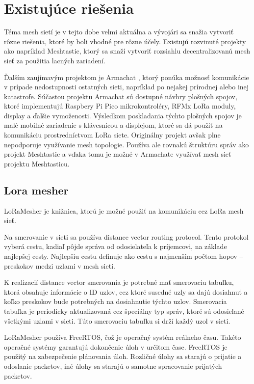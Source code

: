 \documentclass[slovak,master]{diploma}
\begin{document}
\chapter{Existujúce riešenia}
Téma mesh sietí je v tejto dobe velmi aktuálna a vývojári sa snažia vytvoriť rôzne riešenia, ktoré by boli vhodné pre rôzne účely.
Existujú rozvinuté projekty ako napríklad Meshtastic, ktorý sa snaží vytvoriť rozsiahlu decentralizovanú mesh sieť za použitia lacných zariadení.

Ďalším zaujímavým projektom je Armachat \cite{armachat}, ktorý ponúka možnosť komunikácie v prípade nedostupnosti ostatných sieti, napríklad po nejakej prírodnej alebo inej katastrofe.
Súčastou projektu Armachat sú dostupné návhry plošných spojov, ktoré implementujú Raspbery Pi Pico mikrokontroléry, RFMx LoRa moduly, display a ďalšie vymoženosti.
Výsledkom poskladania týchto plošných spojov je malé mobilné zariadenie s klávesnicou a displejom, ktoré sa dá použiť na komunikáciu prostredníctvom LoRa siete.
Originálny projekt avšak plne nepodporuje využívanie mesh topologie. Používa ale rovnakú štruktúru správ ako projekt Meshtastic a vďaka tomu je možné 
v Armachate využívať mesh sieť projektu Meshtasticu.

\section{Lora mesher}
LoRaMesher \cite{loramesher} je knižnica, ktorú je možné použiť na komunikáciu cez LoRa mesh sieť.

Na smerovanie v sieti sa používa distance vector routing protocol. Tento protokol vyberá cestu, kadiaľ pôjde správa od odosielateľa k príjemcovi, na základe 
najlepšej cesty. Najlepšiu cestu definuje ako cestu s najmenším počtom hopov -- preskokov medzi uzlami v mesh sieti.

K realizacií distance vector smerovania je potrebné mať smerovaciu tabuľku, ktorá obsahuje informácie o ID uzlov, cez ktoré susedné uzly sa dajú dosiahnuť a 
koľko preskokov bude potrebných na dosiahnutie týchto uzlov. Smerovacia tabuľka je periodicky aktualizovaná cez špeciálny typ správ, ktoré sú odosielané 
všetkými uzlami v sieti. Túto smerovaciu tabuľku si drží každý uzol v sieti.

LoRaMesher používa FreeRTOS, čož je operačný systém reálneho času. Takéto operačné systémy garantujú dokončenie úloh v určitom čase.
FreeRTOS je použitý na zabezpečenie plánovania úloh. Rozličné úlohy sa starajú o prijatie a odoslanie packetov, iné úlohy sa starajú o samotne 
spracovanie prijatých packetov.
\end{document}
